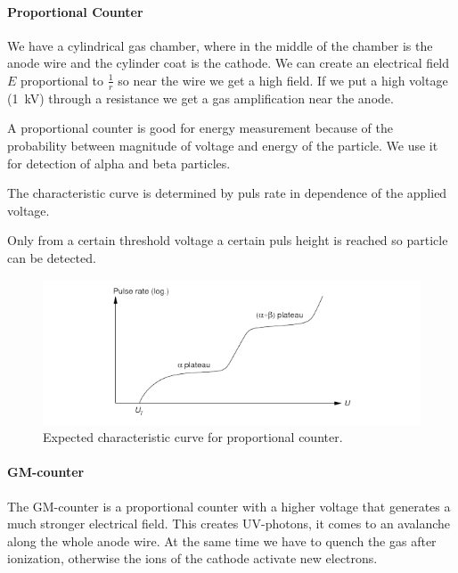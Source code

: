 \paragraph{Proportional Counter}

We have a cylindrical gas chamber, where in the middle of the chamber is the anode wire and the cylinder coat is the cathode.
We can create an electrical field $E$ proportional to $\frac{1}{r}$ so near the wire we get a high field.
If we put a high voltage (\SI{1}{kV}) through a resistance we get a gas amplification near the anode.

A proportional counter is good for energy measurement because of the probability between magnitude of voltage and energy of the particle.
We use it for detection of alpha and beta particles.

The characteristic curve is determined by puls rate in dependence of the applied voltage.

Only from a certain threshold voltage a certain puls height is reached so particle can be detected.

\begin{figure}[H]
\centering
\includegraphics[width=\textwidth]{../Figures/prop.PNG}
\caption{Expected characteristic curve for proportional counter.}
\label{fig:Proportional}
\end{figure}


\paragraph{GM-counter}

The GM-counter is a proportional counter with a higher voltage that generates a much stronger electrical field.
This creates UV-photons, it comes to an avalanche along the whole anode wire.
At the same time we have to quench the gas after ionization, otherwise the ions of the cathode activate new electrons.



